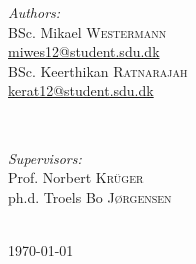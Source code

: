 \documentclass[11pt]{article}
\begin{document}
\begin{titlepage}
\begin{minipage}{0.4\textwidth}
\begin{flushleft} \large
\emph{Authors:}\\
BSc. Mikael \textsc{Westermann}\\
\url{miwes12@student.sdu.dk}\\
BSc. Keerthikan \textsc{Ratnarajah}\\ %
\url{kerat12@student.sdu.dk}
\end{flushleft}
\end{minipage}
~
\begin{minipage}{0.4\textwidth}
\begin{flushright} \large
\emph{Supervisors:} \\
Prof. Norbert \textsc{Krüger}\\ %
ph.d. Troels Bo \textsc{Jørgensen}\\
\end{flushright}
\end{minipage}\\ %


\vfill
{\large \today} %


 



\end{titlepage}
\tableofcontents
\newpage
\listoffigures
\newpage
%
%
%
%


\end{document}
